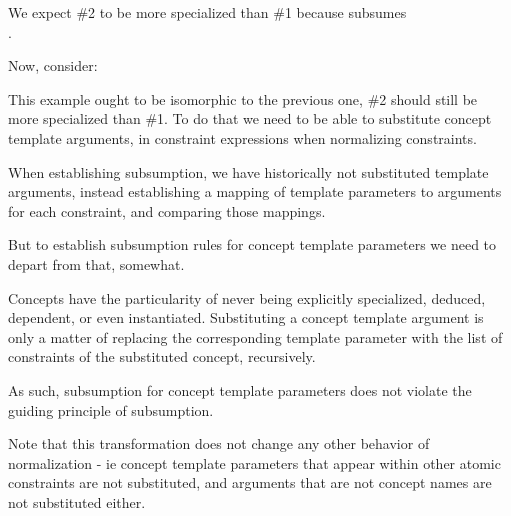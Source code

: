 \documentclass{wg21}
\begin{document}
We expect \#2 to be more specialized than \#1 because  subsumes\\
.

Now, consider:



This example ought to be isomorphic to the previous one, \#2 should still be more specialized than \#1.
To do that we need to be able to substitute concept template arguments, in constraint expressions when normalizing constraints.

When establishing subsumption, we have historically not substituted template arguments, instead establishing a mapping of template parameters to arguments for each
constraint, and comparing those mappings.

But to establish subsumption rules for concept template parameters we need to depart from that, somewhat.

Concepts have the particularity of never being explicitly specialized, deduced, dependent, or even instantiated.
Substituting a concept template argument is only a matter of replacing the corresponding template parameter with the list of constraints of the substituted
concept, recursively.

As such, subsumption for concept template parameters does not violate the guiding principle of subsumption.


Note that this transformation does not change any other behavior of normalization - ie concept template parameters that appear within other atomic constraints
are not substituted, and arguments that are not concept names are not substituted either.
\end{document}
